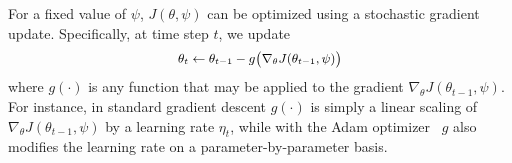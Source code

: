 For a fixed value of $\psi$, $J(\theta, \psi)$ can be optimized using a stochastic gradient update. Specifically, at time step $t$, we update
\begin{equation}
  \label{eqn:theta_update_rule}
   \small
  \begin{aligned}
    \theta_t \leftarrow \theta_{t-1} - g\big( \nabla_\theta J(\theta_{t-1}, \psi) \big)
  \end{aligned}
\end{equation}
where $g(\cdot)$ is any function that may be applied to the gradient $\nabla_\theta J(\theta_{t-1}, \psi)$. For instance, in standard gradient descent $g(\cdot)$ is simply a linear scaling of $\nabla_\theta J(\theta_{t-1}, \psi)$ by a learning rate $\eta_t$, while with the Adam optimizer~\citep{adam} $g$ also modifies the learning rate on a parameter-by-parameter basis.

